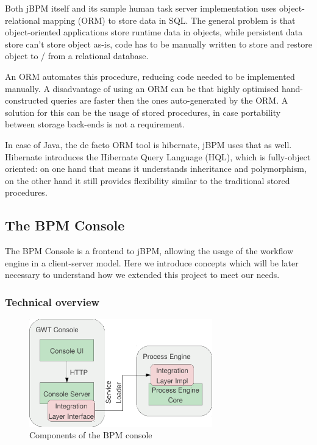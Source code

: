 Both jBPM itself and its sample human task server implementation uses
object-relational mapping (ORM) to store data in SQL. The general problem is
that object-oriented applications store runtime data in objects, while
persistent data store can't store object as-is, code has to be manually written
to store and restore object to / from a relational database.

An ORM automates this procedure, reducing code needed to be implemented
manually. A disadvantage of using an ORM can be that highly optimised
hand-constructed queries are faster then the ones auto-generated by the ORM. A
solution for this can be the usage of stored procedures, in case portability
between storage back-ends is not a requirement.

In case of Java, the de facto ORM tool is hibernate, jBPM uses that as well.
Hibernate introduces the Hibernate Query Language (HQL), which is fully-object
oriented: on one hand that means it understands inheritance and polymorphism,
on the other hand it still provides flexibility similar to the traditional
stored procedures.

\subsection{The BPM Console}
\label{sec:bpm-console}

The BPM Console is a frontend to jBPM, allowing the usage of the workflow
engine in a client-server model. Here we introduce concepts which will be later
necessary to understand how we extended this project to meet our needs.

\subsubsection*{Technical overview}

\begin{figure}[H]
\centering
\includegraphics[width=300px,keepaspectratio]{bpm-console.pdf}
\caption{Components of the BPM console}
\label{fig:bpm-console}
\end{figure}

